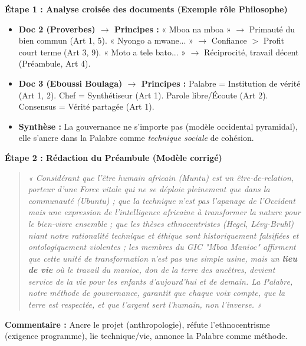 \documentclass[11pt]{article}
\newcommand{\cle}[1]{{\popxbold\color{popdark}#1}}
\begin{document}
\begin{exoresolu}
\textbf{Étape 1 : Analyse croisée des documents (Exemple rôle Philosophe)}
\begin{itemize}
    \item \textbf{Doc 2 (Proverbes) $\rightarrow$ Principes :} « Mboa na mboa » $\rightarrow$ Primauté du bien commun (Art 1, 5). « Nyongo a mwane... » $\rightarrow$ Confiance $>$ Profit court terme (Art 3, 9). « Moto a tele bato... » $\rightarrow$ Réciprocité, travail décent (Préambule, Art 4).
    \item \textbf{Doc 3 (Eboussi Boulaga) $\rightarrow$ Principes :} Palabre = Institution de vérité (Art 1, 2). Chef = Synthétiseur (Art 1). Parole libre/Écoute (Art 2). Consensus = Vérité partagée (Art 1).
    \item \textbf{Synthèse :} La gouvernance ne s'importe pas (modèle occidental pyramidal), elle s'ancre dans la \cle{Palabre} comme \emph{technique sociale} de cohésion.
\end{itemize}

\textbf{Étape 2 : Rédaction du Préambule (Modèle corrigé)}
\begin{quote}
\textit{« Considérant que l'être humain africain (Muntu) est un être-de-relation, porteur d'une Force vitale qui ne se déploie pleinement que dans la communauté (Ubuntu) ; que la technique n'est pas l'apanage de l'Occident mais une expression de l'intelligence africaine à transformer la nature pour le bien-vivre ensemble ; que les thèses ethnocentristes (Hegel, Lévy-Bruhl) niant notre rationalité technique et éthique sont historiquement falsifiées et ontologiquement violentes ; les membres du GIC "Mboa Manioc" affirment que cette unité de transformation n'est pas une simple usine, mais un \textbf{lieu de vie} où le travail du manioc, don de la terre des ancêtres, devient service de la vie pour les enfants d'aujourd'hui et de demain. La Palabre, notre méthode de gouvernance, garantit que chaque voix compte, que la terre est respectée, et que l'argent sert l'humain, non l'inverse. »}
\end{quote}
\textbf{Commentaire :} Ancre le projet (anthropologie), réfute l'ethnocentrisme (exigence programme), lie technique/vie, annonce la Palabre comme méthode.


\end{exoresolu}
\end{document}
